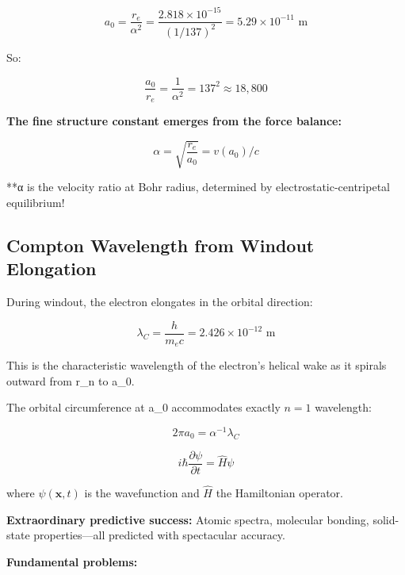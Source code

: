 \begin{equation}
\boxed{a_0 = \frac{r_e}{\alpha^2} = \frac{2.818 \times 10^{-15}}{(1/137)^2} = 5.29 \times 10^{-11} \text{ m}}
\end{equation}

So:

\begin{equation}
\frac{a_0}{r_e} = \frac{1}{\alpha^2} = 137^2 \approx 18,800
\end{equation}

\textbf{The fine structure constant emerges from the force balance:}

\begin{equation}
\alpha = \sqrt{\frac{r_e}{a_0}} = v(a_0)/c
\end{equation}

**α is the velocity ratio at Bohr radius, determined by electrostatic-centripetal equilibrium!

\subsection{Compton Wavelength from Windout Elongation}

During windout, the electron elongates in the orbital direction:

\begin{equation}
\lambda_C = \frac{h}{m_e c} = 2.426 \times 10^{-12} \text{ m}
\end{equation}

This is the characteristic wavelength of the electron's helical wake as it spirals outward from r_n to a_0.

The orbital circumference at a_0 accommodates exactly $n = 1$ wavelength:

\begin{equation}
2\pi a_0 = \alpha^{-1} \lambda_C
\end{equation}

\begin{equation}
i\hbar \frac{\partial \psi}{\partial t} = \hat{H} \psi
\label{eq:schrodinger}
\end{equation}

where $\psi(\mathbf{x},t)$ is the wavefunction and $\hat{H}$ the Hamiltonian operator.

\textbf{Extraordinary predictive success:} Atomic spectra, molecular bonding, solid-state properties—all predicted with spectacular accuracy.

\textbf{Fundamental problems:}

